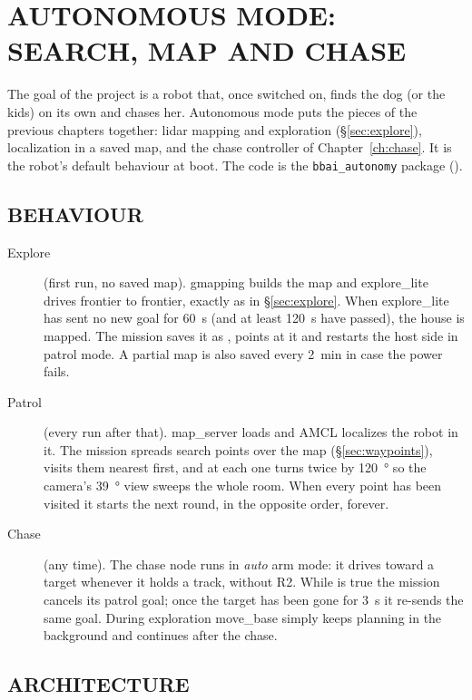 \chapter{AUTONOMOUS MODE: SEARCH, MAP AND CHASE}
\label{ch:autonomy}

The goal of the project is a robot that, once switched on, finds the dog (or
the kids) on its own and chases her. Autonomous mode puts the pieces of the
previous chapters together: lidar mapping and exploration
(\S\ref{sec:explore}), localization in a saved map, and the chase controller
of Chapter~\ref{ch:chase}. It is the robot's default behaviour at boot.
The code is the \texttt{bbai\_autonomy} package
().

\section{BEHAVIOUR}
\label{sec:autobehave}

\begin{description}
\item[Explore] (first run, no saved map). gmapping builds the map and
  explore\_lite drives frontier to frontier, exactly as in
  \S\ref{sec:explore}. When explore\_lite has sent no new goal for
  \SI{60}{s} (and at least \SI{120}{s} have passed), the house is mapped.
  The mission saves it as , points
   at it and restarts the host side in patrol mode.
  A partial map is also saved every \SI{2}{min} in case the power fails.
\item[Patrol] (every run after that). map\_server loads
   and AMCL localizes the robot in it. The mission spreads
  search points over the map (\S\ref{sec:waypoints}), visits them nearest
  first, and at each one turns twice by \SI{120}{\degree} so the camera's
  \SI{39}{\degree} view sweeps the whole room. When every point has been
  visited it starts the next round, in the opposite order, forever.
\item[Chase] (any time). The chase node runs in \emph{auto} arm mode: it
  drives toward a target whenever it holds a track, without R2. While
   is true the mission cancels its patrol goal; once
  the target has been gone for \SI{3}{s} it re-sends the same goal. During
  exploration move\_base simply keeps planning in the background and
  continues after the chase.
\end{description}

\section{ARCHITECTURE}
\label{sec:autoarch}

